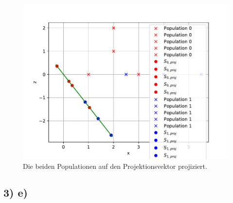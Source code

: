 \begin{figure}[H]
  \includegraphics[width=\linewidth]{Python/Aufgabe3d.pdf}
  \caption{Die beiden Populationen auf den Projektionsvektor projiziert.}
\end{figure}




\subsection*{3) e)}

